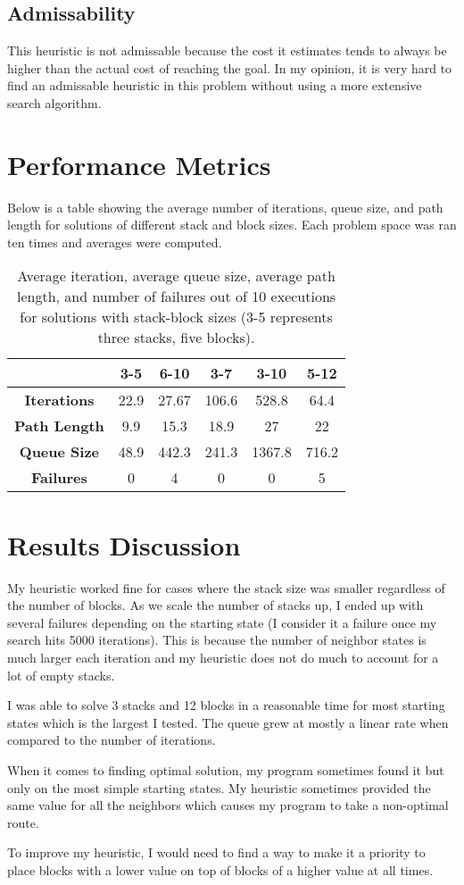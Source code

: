 \documentclass[12pt]{article}
\let\Oldsection\section
\renewcommand{\section}{\FloatBarrier\Oldsection}
\let\Oldsubsection\subsection
\renewcommand{\subsection}{\FloatBarrier\Oldsubsection}
\begin{document}
\subsection{Admissability}
This heuristic is not admissable because the cost it estimates tends to always be 
higher than the actual cost of reaching the goal. In my opinion, it is very hard to find
an admissable heuristic in this problem without using a more extensive search algorithm.

\section{Performance Metrics}

Below is a table showing the average number of iterations, queue size, and path length
for solutions of different stack and block sizes. Each problem space was ran ten times
and averages were computed.

\begin{table}[ht]
\centering
\begin{tabular}{|c|c|c|c|c|c|}
\hline
	& \textbf{3-5} & \textbf{6-10} & \textbf{3-7} & \textbf{3-10} & \textbf{5-12} \\ \hline
\textbf{Iterations} & 22.9 & 27.67 & 106.6 & 528.8 & 64.4 \\ \hline
\textbf{Path Length} & 9.9 & 15.3 & 18.9 & 27 & 22 \\ \hline
\textbf{Queue Size} & 48.9 & 442.3 & 241.3 & 1367.8 &  716.2 \\ \hline
\textbf{Failures} & 0 & 4 & 0 & 0 & 5\\ \hline
\end{tabular}
\caption{Average iteration, average queue size, average path 
length, and number of failures out of 10 executions for 
solutions with stack-block sizes (3-5 represents three 
stacks, five blocks).}
\end{table}

\section{Results Discussion}

My heuristic worked fine for cases where the stack size was smaller regardless
of the number of blocks. As we scale the number of stacks up, I ended up with several 
failures depending on the starting state (I consider it a failure once my search hits 5000
iterations). This is because the number of neighbor states is much larger each iteration and my
heuristic does not do much to account for a lot of empty stacks.

I was able to solve 3 stacks and 12 blocks in a reasonable time for most starting states
which is the largest I tested. The queue grew at mostly a linear rate when compared to the 
number of iterations. 

When it comes to finding optimal solution, my program sometimes found it but only on the 
most simple starting states. My heuristic sometimes provided the same value for all 
the neighbors which causes my program to take a non-optimal route.

To improve my heuristic, I would need to find a way to make it a priority to place blocks 
with a lower value on top of blocks of a higher value at all times.
\end{document}
